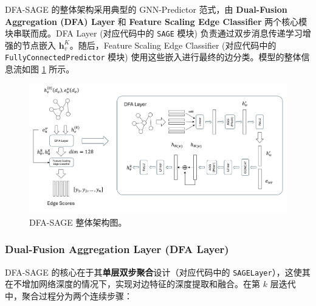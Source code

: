 \documentclass{article}
\begin{document}
DFA-SAGE 的整体架构采用典型的 GNN-Predictor 范式，由 \textbf{Dual-Fusion Aggregation (DFA) Layer} 和 \textbf{Feature Scaling Edge Classifier} 两个核心模块串联而成。DFA Layer (对应代码中的 \texttt{SAGE} 模块) 负责通过双步消息传递学习增强的节点嵌入 $\mathbf{h}_v^K$。随后，Feature Scaling Edge Classifier (对应代码中的 \texttt{FullyConnectedPredictor} 模块) 使用这些嵌入进行最终的边分类。模型的整体信息流如图 \ref{fig:overall_architecture} 所示。

\begin{figure}[H]
    \centering
    \includegraphics[width=\textwidth]{images/DFA-SAGE-architecture.png}
    \caption{DFA-SAGE 整体架构图。}
    \label{fig:overall_architecture}
\end{figure}

\subsubsection{Dual-Fusion Aggregation Layer (DFA Layer)}

DFA-SAGE 的核心在于其\textbf{单层双步聚合}设计（对应代码中的 \texttt{SAGELayer}），这使其在不增加网络深度的情况下，实现对边特征的深度提取和融合。在第 $k$ 层迭代中，聚合过程分为两个连续步骤：
\end{document}
